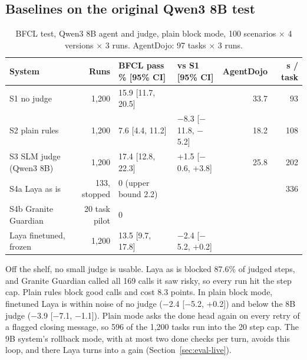 \documentclass[10pt,a4paper]{article}
\newcommand{\tablestyle}{\footnotesize\rowcolors{2}{rowshade}{white}}
\newcommand{\m}{$-$}
\begin{document}
\subsection{Baselines on the original Qwen3 8B test}
\begin{table}[H]
\centering\tablestyle
\caption{BFCL test, Qwen3 8B agent and judge, plain block mode, 100 scenarios $\times$ 4 versions $\times$ 3 runs. AgentDojo: 97 tasks $\times$ 3 runs.}\label{tab:test8b}
\begin{tabularx}{\linewidth}{Yrllrr}
\toprule
\textbf{System} & \textbf{Runs} & \textbf{BFCL pass \% [95\% CI]} & \textbf{vs S1 [95\% CI]} & \textbf{AgentDojo} & \textbf{s / task} \\
\midrule
S1 no judge & 1,200 & 15.9 [11.7, 20.5] & & 33.7 & 93 \\
S2 plain rules & 1,200 & 7.6 [4.4, 11.2] & \m8.3 [\m11.8, \m5.2] & 18.2 & 108 \\
S3 SLM judge (Qwen3 8B) & 1,200 & 17.4 [12.8, 22.3] & +1.5 [\m0.6, +3.8] & 25.8 & 202 \\
S4a Laya as is & 133, stopped & 0 (upper bound 2.2) & & & 336 \\
S4b Granite Guardian & 20 task pilot & 0 & & & \\
Laya finetuned, frozen & 1,200 & 13.5 [9.7, 17.8] & \m2.4 [\m5.2, +0.2] & & \\
\bottomrule
\end{tabularx}
\end{table}
Off the shelf, no small judge is usable. Laya as is blocked 87.6\% of judged steps, and Granite Guardian called all 169 calls it saw risky, so every run hit the step cap. Plain rules block good calls and cost 8.3 points. In plain block mode, finetuned Laya is within noise of no judge (\m2.4 [\m5.2, +0.2]) and below the 8B judge (\m3.9 [\m7.1, \m1.1]). Plain mode asks the done head again on every retry of a flagged closing message, so 596 of the 1,200 tasks run into the 20 step cap. The 9B system's rollback mode, with at most two done checks per turn, avoids this loop, and there Laya turns into a gain (Section~\ref{sec:eval-live}).
\end{document}
